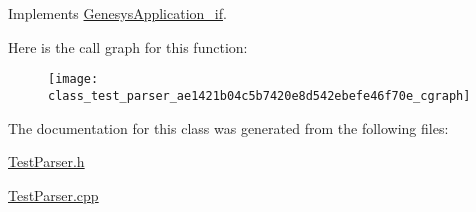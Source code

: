 Implements \hyperlink{class_genesys_application__if_a2b07e7803b410a4a8d0f87422dabb004}{Genesys\+Application\+\_\+if}.



Here is the call graph for this function\+:\nopagebreak
\begin{figure}[H]
\begin{center}
\leavevmode
\texttt{[image: class\_test\_parser\_ae1421b04c5b7420e8d542ebefe46f70e\_cgraph]}
\end{center}
\end{figure}




The documentation for this class was generated from the following files\+:\begin{DoxyCompactItemize}
\item 
\hyperlink{_test_parser_8h}{Test\+Parser.\+h}\item 
\hyperlink{_test_parser_8cpp}{Test\+Parser.\+cpp}\end{DoxyCompactItemize}
